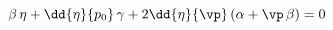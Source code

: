 \begin{equation}\label{22}
  \beta\, \eta +\dd{\eta}{p_0}\,\gamma +2 \dd{\eta}{\vp}\left(\alpha + \vp\, \beta\right) =0
\end{equation}

